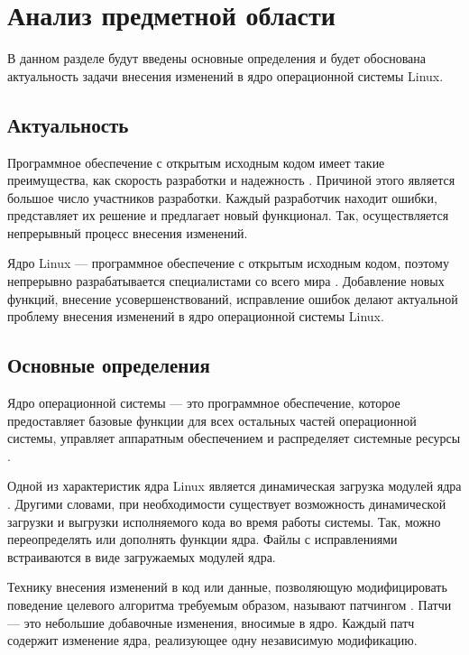 \chapter{Анализ предметной области}

В данном разделе будут введены основные определения и будет обоснована актуальность задачи внесения изменений в ядро операционной системы Linux.

\section{Актуальность}

Программное обеспечение с открытым исходным кодом имеет такие преимущества, как скорость разработки и надежность \cite{open-source}. Причиной этого является большое число участников разработки. Каждый разработчик находит ошибки, представляет их решение и предлагает новый функционал. Так, осуществляется непрерывный процесс внесения изменений.

Ядро Linux --- программное обеспечение с открытым исходным кодом, поэтому непрерывно разрабатывается специалистами со всего мира \cite{statistics}. Добавление новых функций, внесение усовершенствований, исправление ошибок делают актуальной проблему внесения изменений в ядро операционной системы Linux.

\section{Основные определения}

Ядро операционной системы --- это программное обеспечение, которое предоставляет базовые функции для всех остальных частей операционной системы, управляет аппаратным обеспечением и распределяет системные ресурсы \cite{linux}.

Одной из характеристик ядра Linux является динамическая загрузка модулей ядра \cite{modules}. Другими словами, при необходимости существует возможность динамической загрузки и выгрузки исполняемого кода во время работы системы. Так, можно переопределять или дополнять функции ядра. Файлы с исправлениями встраиваются в виде загружаемых модулей ядра.

Технику внесения изменений в код или данные, позволяющую модифицировать поведение целевого алгоритма требуемым образом, называют патчингом \cite{patching}. Патчи --- это небольшие добавочные изменения, вносимые в ядро. Каждый патч содержит изменение ядра, реализующее одну независимую модификацию.


